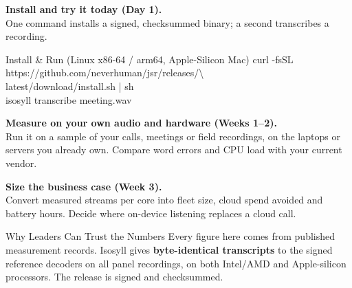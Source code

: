 \documentclass[letterpaper]{article}
\begin{document}
\vspace{1.5pt}

\vspace{3pt}

\noindent
\begin{minipage}[t]{0.478\textwidth}
  \vspace{0pt}
  \vspace{1pt}
  {\fontsize{7.8}{9.8}\selectfont\raggedright
  \noindent{}\;\textbf{Install and try it today (Day 1).}\\
  One command installs a signed, checksummed binary; a second transcribes a recording.
  }
  \begin{codecard}{Install \& Run (Linux x86-64 / arm64, Apple-Silicon Mac)}
curl -fsSL https://github.com/neverhuman/jsr/releases/\textbackslash\\
\hspace*{1.2em}latest/download/install.sh | sh\\
isosyll transcribe meeting.wav
  \end{codecard}
  {\fontsize{7.8}{9.8}\selectfont\raggedright

  \vspace{3pt}
  \noindent{}\;\textbf{Measure on your own audio and hardware (Weeks 1--2).}\\
  Run it on a sample of your calls, meetings or field recordings, on the laptops or servers you already own. Compare word errors and CPU load with your current vendor.

  \vspace{3pt}
  \noindent{}\;\textbf{Size the business case (Week 3).}\\
  Convert measured streams per core into fleet size, cloud spend avoided and battery hours. Decide where on-device listening replaces a cloud call.
  }

  \vspace{3.5pt}
  \begin{execbox}[accent]{Why Leaders Can Trust the Numbers}
    Every figure here comes from published measurement records. Isosyll gives \textbf{byte-identical transcripts} to the signed reference decoders on all \ScalarUtts{} panel recordings, on both Intel/AMD and Apple-silicon processors. The release is signed and checksummed.
  \end{execbox}
\end{minipage}\hfill
\end{document}
